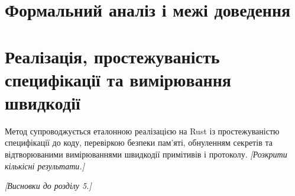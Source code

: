 \section{Формальний аналіз і межі доведення}
\label{sec:opaque-formal}

\section{Реалізація, простежуваність специфікації та вимірювання швидкодії}
\label{sec:opaque-impl}
Метод супроводжується еталонною реалізацією на Rust із простежуваністю специфікації до коду, перевіркою безпеки пам'яті, обнуленням секретів та відтворюваними вимірюваннями швидкодії примітивів і протоколу. \emph{[Розкрити кількісні результати.]}

\emph{[Висновки до розділу 5.]}
